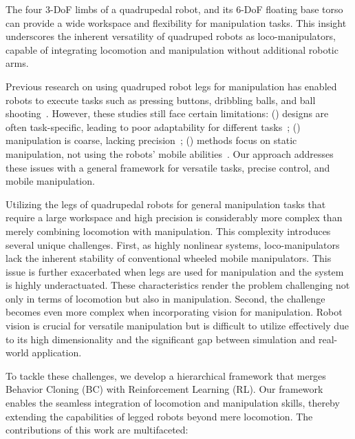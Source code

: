 \label{sec:intro}


The four 3-DoF limbs of a quadrupedal robot, and its 6-DoF floating base torso can provide a wide workspace and flexibility for manipulation tasks. This insight underscores the inherent versatility of quadruped robots as loco-manipulators, capable of integrating locomotion and manipulation without additional robotic arms.

Previous research on using quadruped robot legs for manipulation has enabled robots to execute tasks such as pressing buttons, dribbling balls, and ball shooting~\cite{cheng2023legmanip, huang2023creating, ji2023Hierarchical,Ji2023DribbleBot}. However, these studies still face certain limitations: () designs are often task-specific, leading to poor adaptability for different tasks~\cite{cheng2023legmanip, huang2023creating, ji2023Hierarchical,Ji2023DribbleBot}; () manipulation is coarse, lacking precision~\cite{huang2023creating, ji2023Hierarchical}; () methods focus on static manipulation, not using the robots' mobile abilities~\cite{cheng2023legmanip, ji2023Hierarchical}. Our approach addresses these issues with a general framework for versatile tasks, precise control, and mobile manipulation.


Utilizing the legs of quadrupedal robots for general manipulation tasks that require a large
workspace and high precision is considerably more complex than merely combining locomotion with manipulation. This complexity introduces several unique challenges.
First, as highly nonlinear systems, loco-manipulators lack the inherent stability of conventional wheeled mobile manipulators. This issue is further exacerbated when legs are used for manipulation and the system is highly underactuated. These characteristics render the problem challenging not only in terms of locomotion but also in manipulation.
Second, the challenge becomes even more complex when incorporating vision for manipulation. Robot vision is crucial for versatile manipulation but is difficult to utilize effectively due to its high dimensionality and the significant gap between simulation and real-world application.


To tackle these challenges, we develop a hierarchical framework that merges Behavior Cloning (BC) with Reinforcement Learning (RL). 
Our framework enables the seamless integration of locomotion and manipulation skills, thereby extending the capabilities of legged robots beyond mere locomotion. The contributions of this work are multifaceted:

